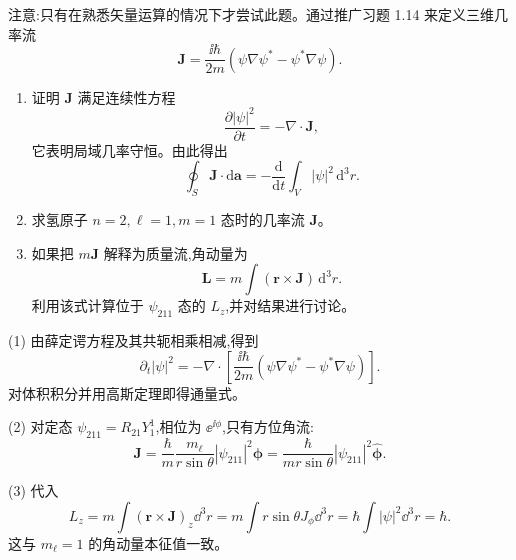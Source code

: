 \begin{question}
注意:只有在熟悉矢量运算的情况下才尝试此题。通过推广习题 1.14 来定义三维几率流
\[
\mathbf J=\frac{\ii\hbar}{2m}(\psi\nabla\psi^*-\psi^*\nabla\psi).
\]
\begin{enumerate}
\item 证明 $\mathbf J$ 满足连续性方程
\[
\frac{\partial |\psi|^2}{\partial t}=-\nabla\cdot\mathbf J,
\]
它表明局域几率守恒。由此得出
\[
\oint_S \mathbf J\cdot\mathrm d\mathbf a=-\frac{\mathrm d}{\mathrm dt}\int_V |\psi|^2\,\mathrm d^3r.
\]
\item 求氢原子 $n=2,\ell=1,m=1$ 态时的几率流 $\mathbf J$。
\item 如果把 $m\mathbf J$ 解释为质量流,角动量为
\[
\mathbf L=m\int (\mathbf r\times\mathbf J)\,\mathrm d^3r.
\]
利用该式计算位于 $\psi_{211}$ 态的 $L_z$,并对结果进行讨论。
\end{enumerate}
\end{question}
\begin{solution}

(1) 由薛定谔方程及其共轭相乘相减,得到
\[
\partial_t|\psi|^2=-\nabla\cdot\left[\frac{\ii\hbar}{2m}(\psi\nabla\psi^*-\psi^*\nabla\psi)\right].
\]
对体积积分并用高斯定理即得通量式。

(2) 对定态 $\psi_{211}=R_{21}Y_1^1$,相位为 $\ee^{\ii\phi}$,只有方位角流:
\[
\mathbf J=\frac{\hbar}{m}\frac{m_\ell}{r\sin\theta}|\psi_{211}|^2\hat{\boldsymbol\phi}
=\frac{\hbar}{mr\sin\theta}|\psi_{211}|^2\hat{\boldsymbol\phi}.
\]

(3) 代入
\[
L_z=m\int (\mathbf r\times\mathbf J)_z\dd^3r
=m\int r\sin\theta J_\phi\dd^3r
=\hbar\int|\psi|^2\dd^3r=\hbar.
\]
这与 $m_\ell=1$ 的角动量本征值一致。

\end{solution}

